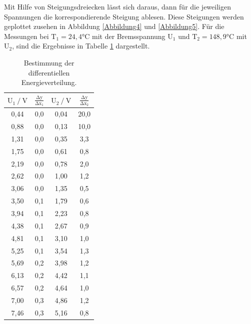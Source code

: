 \begin{flushleft}
    Mit Hilfe von Steigungsdreiecken lässt sich daraus, dann für die jeweiligen Spannungen die korrespondierende Steigung ablesen.
    Diese Steigungen werden geplottet zusehen in Abbildung \ref{Abbildung4} und \ref{Abbildung5}. 
    Für die Messungen bei $\text{T}_{1} = 24,4\unit{\celsius}$ mit der Bremsspannung $\text{U}_{1}$ und $\text{T}_{2} = 148,9\unit{\celsius}$ mit $\text{U}_{2}$, sind die Ergebnisse in Tabelle \ref{Tabelle2} dargestellt.
\end{flushleft}

\begin{table}[H]
    \centering
    \caption{Bestimmung der differentiellen Energieverteilung.} 
    \label{Tabelle2}
    \begin{tabular} {c  c  c  c}
        \toprule
        {$ \text{U}_{1} \mathbin{/} \unit{\volt} $} &
        {$ \frac{\increment \text{y}}{\increment \text{x}_{1}} $} &
        {$ \text{U}_{2} \mathbin{/} \unit{\volt} $} &
        {$ \frac{\increment \text{y}}{\increment \text{x}_{2}} $} \\
        \midrule
        0,44 & 0,0  &\cellcolor{red} 0,04 &\cellcolor{red} 20,0 \\
        0,88 & 0,0  &\cellcolor{red} 0,13 &\cellcolor{red} 10,0 \\
        1,31 & 0,0  &\cellcolor{red} 0,35 &\cellcolor{red} 3,3 \\
        1,75 & 0,0  &\cellcolor{red} 0,61 &\cellcolor{red} 0,8 \\
        2,19 & 0,0  &\cellcolor{red} 0,78 &\cellcolor{red} 2,0 \\
        2,62 & 0,0  &\cellcolor{red} 1,00 &\cellcolor{red} 1,2 \\
        3,06 & 0,0  &\cellcolor{red} 1,35 &\cellcolor{red} 0,5 \\
        3,50 & 0,1  & 1,79 & 0,6 \\
        3,94 & 0,1  & 2,23 & 0,8 \\
        4,38 & 0,1  & 2,67 & 0,9 \\
        4,81 & 0,1  & 3,10 & 1,0 \\
        5,25 & 0,1  & 3,54 & 1,3 \\
        5,69 & 0,2  & 3,98 & 1,2 \\
        6,13 & 0,2  & 4,42 & 1,1 \\
        6,57 & 0,2  & 4,64 & 1,0 \\
        7,00 & 0,3  & 4,86 & 1,2 \\
        7,46 & 0,3  & 5,16 & 0,8 \\

\end{tabular}
\end{table}
